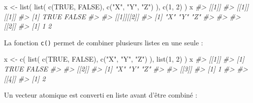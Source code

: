 \documentclass[
  french,
]{scrbook}
\newenvironment{Shaded}{\begin{snugshade}}{\end{snugshade}}
\newcommand{\CommentTok}[1]{\textcolor[rgb]{0.56,0.35,0.01}{\textit{#1}}}
\newcommand{\ConstantTok}[1]{\textcolor[rgb]{0.00,0.00,0.00}{#1}}
\newcommand{\DecValTok}[1]{\textcolor[rgb]{0.00,0.00,0.81}{#1}}
\newcommand{\FunctionTok}[1]{\textcolor[rgb]{0.00,0.00,0.00}{#1}}
\newcommand{\NormalTok}[1]{#1}
\newcommand{\OtherTok}[1]{\textcolor[rgb]{0.56,0.35,0.01}{#1}}
\newcommand{\StringTok}[1]{\textcolor[rgb]{0.31,0.60,0.02}{#1}}
\begin{document}
\begin{Shaded}
\begin{Highlighting}[]
\NormalTok{x }\OtherTok{\textless{}{-}} \FunctionTok{list}\NormalTok{(}
  \FunctionTok{list}\NormalTok{(}
    \FunctionTok{c}\NormalTok{(}\ConstantTok{TRUE}\NormalTok{, }\ConstantTok{FALSE}\NormalTok{),}
    \FunctionTok{c}\NormalTok{(}\StringTok{"X"}\NormalTok{, }\StringTok{"Y"}\NormalTok{, }\StringTok{"Z"}\NormalTok{)}
\NormalTok{  ), }
  \FunctionTok{c}\NormalTok{(}\DecValTok{1}\NormalTok{, }\DecValTok{2}\NormalTok{)}
\NormalTok{)}
\NormalTok{x}
\CommentTok{\#\textgreater{} [[1]]}
\CommentTok{\#\textgreater{} [[1]][[1]]}
\CommentTok{\#\textgreater{} [1]  TRUE FALSE}
\CommentTok{\#\textgreater{} }
\CommentTok{\#\textgreater{} [[1]][[2]]}
\CommentTok{\#\textgreater{} [1] "X" "Y" "Z"}
\CommentTok{\#\textgreater{} }
\CommentTok{\#\textgreater{} }
\CommentTok{\#\textgreater{} [[2]]}
\CommentTok{\#\textgreater{} [1] 1 2}
\end{Highlighting}
\end{Shaded}

La fonction \texttt{c()} permet de combiner plusieurs listes en une seule :

\begin{Shaded}
\begin{Highlighting}[]
\NormalTok{x }\OtherTok{\textless{}{-}} \FunctionTok{c}\NormalTok{(}
  \FunctionTok{list}\NormalTok{(}
    \FunctionTok{c}\NormalTok{(}\ConstantTok{TRUE}\NormalTok{, }\ConstantTok{FALSE}\NormalTok{),}
    \FunctionTok{c}\NormalTok{(}\StringTok{"X"}\NormalTok{, }\StringTok{"Y"}\NormalTok{, }\StringTok{"Z"}\NormalTok{)}
\NormalTok{  ), }
  \FunctionTok{list}\NormalTok{(}\DecValTok{1}\NormalTok{, }\DecValTok{2}\NormalTok{)}
\NormalTok{)}
\NormalTok{x}
\CommentTok{\#\textgreater{} [[1]]}
\CommentTok{\#\textgreater{} [1]  TRUE FALSE}
\CommentTok{\#\textgreater{} }
\CommentTok{\#\textgreater{} [[2]]}
\CommentTok{\#\textgreater{} [1] "X" "Y" "Z"}
\CommentTok{\#\textgreater{} }
\CommentTok{\#\textgreater{} [[3]]}
\CommentTok{\#\textgreater{} [1] 1}
\CommentTok{\#\textgreater{} }
\CommentTok{\#\textgreater{} [[4]]}
\CommentTok{\#\textgreater{} [1] 2}
\end{Highlighting}
\end{Shaded}

Un vecteur atomique est converti en liste avant d'être combiné :
\end{document}
